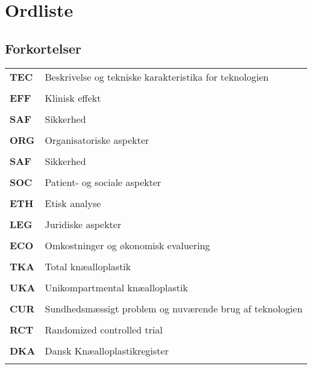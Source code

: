 \chapter*{Ordliste} \label{ordliste}
\vspace{-.75cm}
\section*{Forkortelser}
\vspace{0.75cm}
\begin{longtable}{p{}  p{}}

\textbf{TEC} & Beskrivelse og tekniske karakteristika for teknologien
\\ \\
\textbf{EFF} & Klinisk effekt
\\ \\
\textbf{SAF}  & Sikkerhed     
\\ \\
\textbf{ORG}  & Organisatoriske aspekter     
\\ \\
\textbf{SAF} & Sikkerhed
\\ \\
\textbf{SOC} & Patient- og sociale aspekter
\\ \\
\textbf{ETH}  & Etisk analyse 
\\ \\
\textbf{LEG}  & Juridiske aspekter 
\\ \\
\textbf{ECO}  & Omkostninger og økonomisk evaluering
\\ \\
\textbf{TKA}  & Total knæalloplastik 
\\ \\
\textbf{UKA} & Unikompartmental knæalloplastik
\\ \\
\textbf{CUR} & Sundhedsmæssigt problem og nuværende brug af teknologien
\\ \\
\textbf{RCT} & Randomized controlled trial
\\ \\
\textbf{DKA} & Dansk Knæalloplastikregister
\\ \\

\end{longtable}
